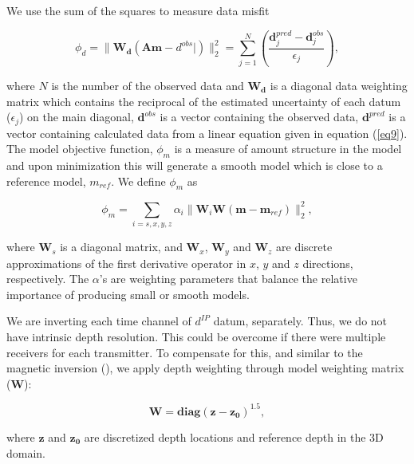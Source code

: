 \documentclass[extra,mreferee]{gji}
\newcommand{\dip}{d^{IP}}
\begin{document}
We use the sum of the squares to measure data misfit
\begin{linenomath*}
\begin{equation}
  \phi_d = \| \mathbf{W_d}(\mathbf{A}\mathbf{m}-d^{obs}|)\|^2_2 =
  \sum^N_{j=1}(\frac{\mathbf{d}^{pred}_j-\mathbf{d}^{obs}_j}{\epsilon_j}),
  \label{eq11}
\end{equation}
\end{linenomath*}
where $N$ is the number of the observed data and $\mathbf{W_d}$ is a diagonal data weighting matrix which contains the reciprocal of the estimated uncertainty of each datum ($\epsilon_j$) on the main diagonal,  $\mathbf{d}^{obs}$ is a vector containing the observed data, $\mathbf{d}^{pred}$ is a vector containing calculated data from a linear equation given in equation (\ref{eq9}).
The model objective function, $\phi_m$ is a measure of amount structure in the model and upon minimization this will generate a smooth model which is close to a reference model, $m_{ref}$. 
We define $\phi_m$ as
\begin{linenomath*}
\begin{equation}
  \phi_m = \sum_{i=s,x,y,z} \alpha_i\| \mathbf{W}_i\mathbf{W}(\mathbf{m}-\mathbf{m}_{ref})\|^2_2,
  \label{eq12}
\end{equation}
\end{linenomath*}
where $\mathbf{W}_s$ is a diagonal matrix, and $\mathbf{W}_x$, $\mathbf{W}_y$ and $\mathbf{W}_z$ are discrete approximations of the first derivative operator in $x$, $y$ and $z$ directions, respectively.  
The $\alpha$'s are weighting parameters that balance the relative importance of producing small or smooth models.

We are inverting each time channel of $\dip$ datum, separately. Thus, we do not have intrinsic depth resolution. This could be overcome if there were multiple receivers for each transmitter. To compensate for this, and similar to the magnetic inversion (\cite{LiMag3D}), we apply depth weighting through model weighting matrix ($\mathbf{W}$):
\begin{linenomath*}
\begin{equation}
    \mathbf{W} = \mathbf{diag}(\mathbf{z-z_0})^{1.5},
    \label{eq: weight_mat}
\end{equation}
\end{linenomath*}
where $\mathbf{z}$ and $\mathbf{z_0}$ are discretized depth locations and reference depth in the 3D domain.
\end{document}
